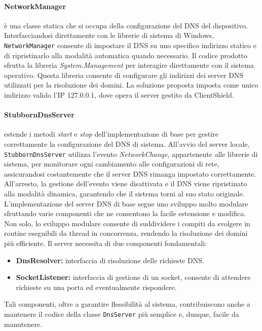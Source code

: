 \documentclass[12pt,a4paper,openright,twoside]{book}
\newcommand{\itemdef}[1]{\item \textbf{#1}}
\newcommand{\class}[1]{\texttt{#1}}
\begin{document}
\paragraph{NetworkManager} è una classe statica che si occupa della configurazione del \gls{DNS} del dispositivo.
Interfacciandosi direttamente con le librerie di sistema di Windows, \class{NetworkManager} consente di impostare il \gls{DNS} su uno specifico indirizzo statico e di ripristinarlo alla modalità automatica quando necessario.
Il codice prodotto sfrutta la libreria \textit{System.Management} per interagire direttamente con il sistema operativo.
Questa libreria consente di configurare gli indirizzi dei server \gls{DNS} utilizzati per la risoluzione dei domini.
La soluzione proposta imposta come unico indirizzo valido l'IP 127.0.0.1, dove opera il server gestito da ClientShield.

\paragraph{StubbornDnsServer} estende i metodi \textit{start} e \textit{stop} dell'implementazione di base per gestire correttamente la configurazione del \gls{DNS} di sistema.
All'avvio del server locale, \class{StubbornDnsServer} utilizza l'evento \textit{NetworkChange}, appartenente alle librerie di sistema, per monitorare ogni cambiamento alle configurazioni di rete, assicurandosi costantemente che il server \gls{DNS} rimanga impostato correttamente.
All'arresto, la gestione dell'evento viene disattivata e il \gls{DNS} viene ripristinato alla modalità dinamica, garantendo che il sistema torni al suo stato originale.\\

L'implementazione del server \gls{DNS} di base segue uno sviluppo molto modulare sfruttando varie componenti che ne consentono la facile estensione e modifica.
Non solo, lo sviluppo modulare consente di suddividere i compiti da svolgere in routine eseguibili da thread in concorrenza, rendendo la risoluzione dei domini più efficiente.
Il server necessita di due componenti fondamentali:
\begin{itemize}
	\itemdef{DnsResolver:} interfaccia di risoluzione delle richieste \gls{DNS}.
	\itemdef{SocketListener:} interfaccia di gestione di un socket, consente di attendere richieste su una porta ed eventualmente rispondere.
\end{itemize}
Tali componenti, oltre a garantire flessibilità al sistema, contribuiscono anche a mantenere il codice della classe \class{DnsServer} più semplice e, dunque, facile da manutenere.
\end{document}
